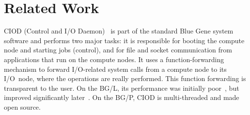 \documentclass[journal]{IEEEtran}
\begin{document}



\section{Related Work}
\label{sec:related-work}

CIOD (Control and I/O Daemon)~\cite{IBM:08} is part of the standard Blue Gene
system software and performs two major tasks: it is responsible for booting
the compute node and starting jobs (control), and for file and socket
communication from applications that run on the compute nodes.
It uses a function-forwarding mechanism to forward I/O-related system calls
from a compute node to its I/O~node, where the operations are really performed.
This function forwarding is transparent to the user.
On the BG/L, its performance was initially poor~\cite{Romein:06}, but
improved significantly later~\cite{Iskra:08}.
On the BG/P, CIOD is multi-threaded and made open source.
\end{document}
